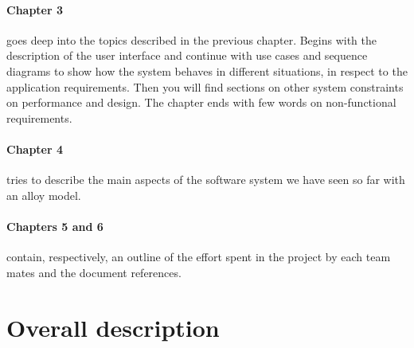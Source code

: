 \documentclass[]{article}
\begin{document}
	\paragraph{Chapter 3} goes deep into the topics described in the previous chapter.
	Begins with the description of the user interface and continue with use cases and sequence diagrams to show how the system behaves in different situations, in respect to the application requirements. Then you will find sections on other system constraints on performance and design. The chapter ends with few words on non-functional requirements.
	
	\paragraph{Chapter 4} tries to describe the main aspects of the software system we have seen so far with an alloy model.
	
	\paragraph{Chapters 5 and 6} contain, respectively, an outline of the effort spent in the project by each team mates and the document references.
	
	\newpage
	\section{Overall description}
	
\end{document}
